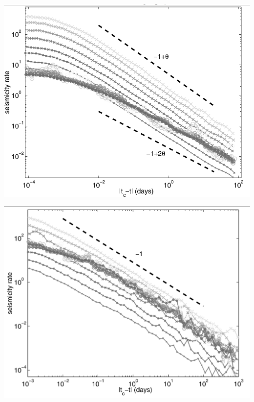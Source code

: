\documentclass[aspectratio=43,9pt]{beamer}
\begin{document}
\begin{frame}
 {}
 
 \begin{minipage}{0.48\linewidth}
   \includegraphics[width=1\linewidth]{Figs/fig3}
 \end{minipage}
 \begin{minipage}{0.48\linewidth}

 \end{minipage}

 
\end{frame}


\begin{frame}
 {}
 
 \begin{minipage}{0.48\linewidth}
   \includegraphics[width=1\linewidth]{Figs/fig4}
 \end{minipage}
 \begin{minipage}{0.48\linewidth}

 \end{minipage}

 
\end{frame}
\end{document}
